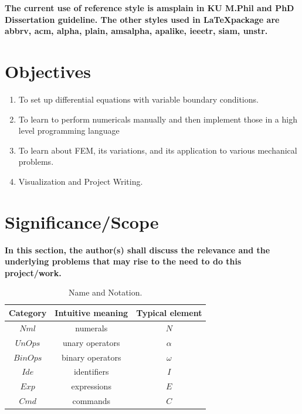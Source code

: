 \noindent
{\color{blue} \bf The current use of reference style is {\color{red} amsplain} in KU M.Phil and PhD Dissertation guideline. The other styles used in \LaTeX package are abbrv, acm, alpha, plain, amsalpha, apalike, ieeetr, siam, unstr.}



\section{{\bf{Objectives}}}
{\bf\color{black}
\begin{enumerate}
 \item To set up differential equations with variable boundary conditions. 
 \item  To learn to perform numericals manually and then implement
 those in a high level programming language
 \item To learn about FEM, its variations, and its application to various
 mechanical problems.
 \item Visualization and Project Writing.
\end{enumerate}
}

\section{\bf Significance/Scope}
{\bf\color{red}In this section, the author(s) shall discuss the relevance and the underlying problems that may rise to the need to do this project/work.}
\begin{table}[htpb]
\caption{Name and Notation.}
\begin{center}
\begin{tabular}{|c|c|c|}\hline
Category & Intuitive meaning & Typical element \\ \hline
                                                    \hline
$\mathit{Nml}$ & numerals & $N$ \\ \hline
$\mathit{UnOps}$ & unary operators & $\alpha$ \\ \hline
$\mathit{BinOps}$ & binary operators & $\omega$ \\ \hline
$\mathit{Ide}$ & identifiers & $I$ \\ \hline
$\mathit{Exp}$ & expressions & $E$ \\ \hline
$\mathit{Cmd}$ & commands & $C$ \\ \hline
\end{tabular}
\end{center}
\end{table}

